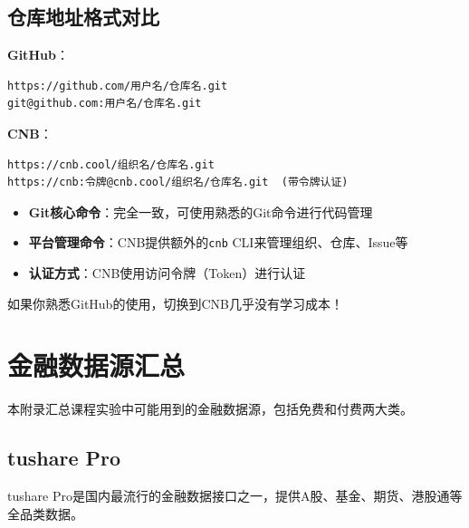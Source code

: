 \section{仓库地址格式对比}

\textbf{GitHub}：

\begin{lstlisting}[style=shell]
https://github.com/用户名/仓库名.git
git@github.com:用户名/仓库名.git
\end{lstlisting}

\textbf{CNB}：

\begin{lstlisting}[style=shell]
https://cnb.cool/组织名/仓库名.git
https://cnb:令牌@cnb.cool/组织名/仓库名.git  (带令牌认证)
\end{lstlisting}

\begin{notebox}[总结]
\begin{itemize}[leftmargin=1em]
  \item \textbf{Git核心命令}：完全一致，可使用熟悉的Git命令进行代码管理
  \item \textbf{平台管理命令}：CNB提供额外的\texttt{cnb} CLI来管理组织、仓库、Issue等
  \item \textbf{认证方式}：CNB使用访问令牌（Token）进行认证
\end{itemize}

如果你熟悉GitHub的使用，切换到CNB几乎没有学习成本！
\end{notebox}


\chapter{金融数据源汇总}

本附录汇总课程实验中可能用到的金融数据源，包括免费和付费两大类。

\section{tushare Pro}

tushare Pro是国内最流行的金融数据接口之一，提供A股、基金、期货、港股通等全品类数据。

